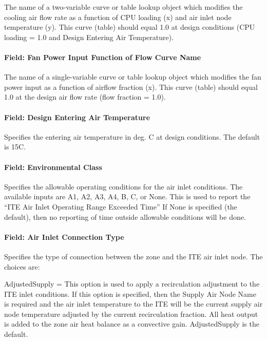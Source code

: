 The name of a two-variable curve or table lookup object which modifies the cooling air flow rate as a function of CPU loading (x) and air inlet node temperature (y). This curve (table) should equal 1.0 at design conditions (CPU loading = 1.0 and Design Entering Air Temperature).

\paragraph{Field: Fan Power Input Function of Flow Curve Name}\label{field-fan-power-input-function-of-flow-curve-name}

The name of a single-variable curve or table lookup object which modifies the fan power input as a function of airflow fraction (x). This curve (table) should equal 1.0 at the design air flow rate (flow fraction = 1.0).

\paragraph{Field: Design Entering Air Temperature}\label{field-design-entering-air-temperature}

Specifies the entering air temperature in deg. C at design conditions. The default is 15C.

\paragraph{Field: Environmental Class}\label{field-environmental-class}

Specifies the allowable operating conditions for the air inlet conditions. The available inputs are A1, A2, A3, A4, B, C, or None. This is used to report the ``ITE Air Inlet Operating Range Exceeded Time'' If None is specified (the default), then no reporting of time outside allowable conditions will be done.

\paragraph{Field: Air Inlet Connection Type}\label{field-air-inlet-connection-type}

Specifies the type of connection between the zone and the ITE air inlet node. The choices are:

AdjustedSupply = This option is used to apply a recirculation adjustment to the ITE inlet conditions. If this option is specified, then the Supply Air Node Name is required and the air inlet temperature to the ITE will be the current supply air node temperature adjusted by the current recirculation fraction. All heat output is added to the zone air heat balance as a convective gain. AdjustedSupply is the default.

